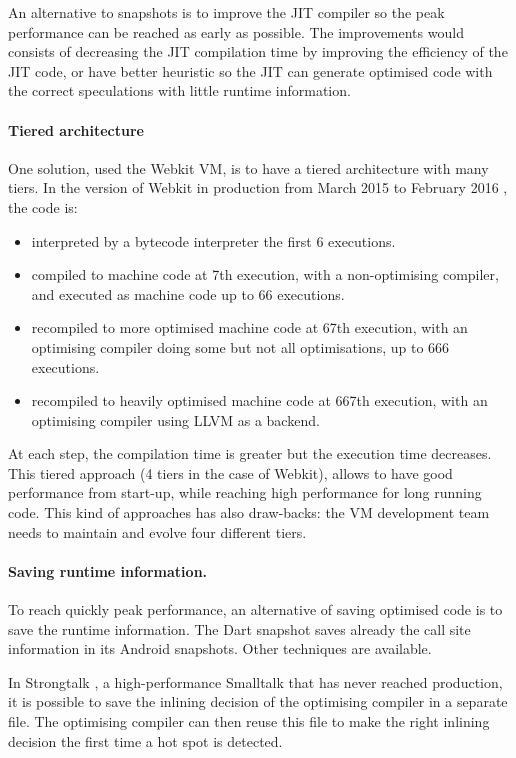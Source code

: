 \documentclass[a4paper,12pt,twoside]{../includes/ThesisStyle}
\begin{document}
An alternative to snapshots is to improve the JIT compiler so the peak performance can be reached as early as possible. The improvements would consists of decreasing the JIT compilation time by improving the efficiency of the JIT code, or have better heuristic so the JIT can generate optimised code with the correct speculations with little runtime information.

\paragraph{Tiered architecture}
One solution, used the Webkit VM\cite{Webkit15}, is to have a tiered architecture with many tiers. In the version of Webkit in production from March 2015 to February 2016 \cite{Webkit15}, the code is:
\begin{itemize}
\item interpreted by a bytecode interpreter the first 6 executions.
\item compiled to machine code at 7th execution, with a non-optimising compiler, and executed as machine code up to 66 executions.
\item recompiled to more optimised machine code at 67th execution, with an optimising compiler doing some but not all optimisations, up to 666 executions.
\item recompiled to heavily optimised machine code at 667th execution, with an optimising compiler using LLVM as a backend.
\end{itemize}

At each step, the compilation time is greater but the execution time decreases. This tiered approach (4 tiers in the case of Webkit), allows to have good performance from start-up, while reaching high performance for long running code. This kind of approaches has also draw-backs: the VM development team needs to maintain and evolve four different tiers.

\paragraph{Saving runtime information.}

To reach quickly peak performance, an alternative of saving optimised code is to save the runtime information. The Dart snapshot saves already the call site information in its Android snapshots. Other techniques are available.

In Strongtalk \cite{Sun06}, a high-performance Smalltalk that has never reached production, it is possible to save the inlining decision of the optimising compiler in a separate file. The optimising compiler can then reuse this file to make the right inlining decision the first time a hot spot is detected.
\end{document}
